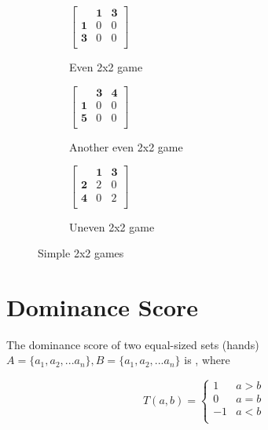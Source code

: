 \documentclass[11pt, oneside]{article} 	%
\begin{document}
\begin{figure}
\centering
\begin{subfigure}{.5\textwidth}
 \centering
$ \left[\begin{array}{ccc}
            & \mathbf{1} & \mathbf{3}\\ 
            \mathbf{1} & 0 & 0\\
            \mathbf{3} & 0 & 0\\
           \end{array}\right] 
$
 \caption{Even 2x2 game}
\label{fig:even_2x2}
\end{subfigure}

\begin{subfigure}{.5\textwidth}
 \centering
$ \left[\begin{array}{ccc}
            & \mathbf{3} & \mathbf{4}\\ 
            \mathbf{1} & 0 & 0\\
            \mathbf{5} & 0 & 0\\
           \end{array}\right] 
$
 \caption{Another even 2x2 game}
\label{fig:another_even_2x2}
\end{subfigure}

\begin{subfigure}{.5\textwidth}
 \centering
$ \left[\begin{array}{ccc}
            & \mathbf{1} & \mathbf{3}\\ 
            \mathbf{2} & 2 & 0\\
            \mathbf{4} & 0 & 2\\
           \end{array}\right] 
$
 \caption{Uneven 2x2 game}
\label{fig:uneven_2x2}
\end{subfigure}
\caption{Simple 2x2 games}
\label{fig:2x2}
\end{figure}


\section{Dominance Score}

The dominance score of two equal-sized sets (hands) $A = \{a_1, a_2, ... a_n\}, B = \{a_1, a_2, ... a_n\}$ is , where	

\[  
T(a,b) = 
   \begin{cases}
    1 & a > b\\
    0 & a = b \\
    -1 & a < b \\ 
   \end{cases}
\]
\end{document}
